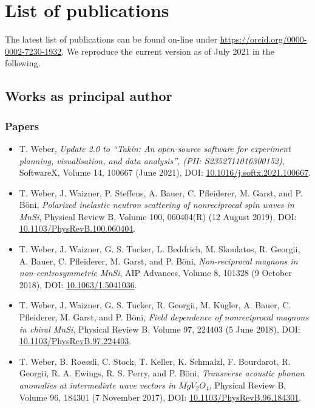\chapter{List of publications}
The latest list of publications can be found on-line under \url{https://orcid.org/0000-0002-7230-1932}. 
We reproduce the current version as of July 2021 in the following.


\section{Works as principal author}
\subsection*{Papers}
\begin{itemize}
	\item T. Weber, \textit{Update 2.0 to ``Takin: An open-source software for experiment planning, visualisation, and data analysis'', (PII: S2352711016300152)},
	SoftwareX, Volume 14, 100667 (June 2021),
	DOI: \href{https://doi.org/10.1016/j.softx.2021.100667}{10.1016/j.softx.2021.100667}.

	\item T. Weber, J. Waizner, P. Steffens, A. Bauer, C. Pfleiderer, M. Garst, and P. B\"oni, 
	\textit{Polarized inelastic neutron scattering of nonreciprocal spin waves in MnSi},
	Physical Review B, Volume 100, 060404(R) (12 August 2019),
	DOI: \href{https://doi.org/10.1103/PhysRevB.100.060404}{10.1103/PhysRevB.100.060404}.

	\item  T. Weber, J. Waizner, G. S. Tucker, L. Beddrich, M. Skoulatos, R. Georgii, A. Bauer, C. Pfleiderer, M. Garst, and P. B\"oni, 
	\textit{Non-reciprocal magnons in non-centrosymmetric MnSi},
	AIP Advances, Volume 8, 101328 (9 October 2018),
	DOI: \href{https://doi.org/10.1063/1.5041036}{10.1063/1.5041036}.

	\item T. Weber, J. Waizner, G. S. Tucker, R. Georgii, M. Kugler, A. Bauer, C. Pfleiderer, M. Garst, and P. B\"oni, 
	\textit{Field dependence of nonreciprocal magnons in chiral MnSi},
	Physical Review B, Volume 97, 224403 (5 June 2018),
	DOI: \href{https://doi.org/10.1103/PhysRevB.97.224403}{10.1103/PhysRevB.97.224403}.

	\item T. Weber, B. Roessli, C. Stock, T. Keller, K. Schmalzl, F. Bourdarot, R. Georgii, R. A. Ewings, R. S. Perry, and P. B\"oni, 
	\textit{Transverse acoustic phonon anomalies at intermediate wave vectors in $MgV_2O_4$},
	Physical Review B, Volume 96, 184301 (7 November 2017),
	DOI: \href{https://doi.org/10.1103/PhysRevB.96.184301}{10.1103/PhysRevB.96.184301}.
	

\end{itemize}
